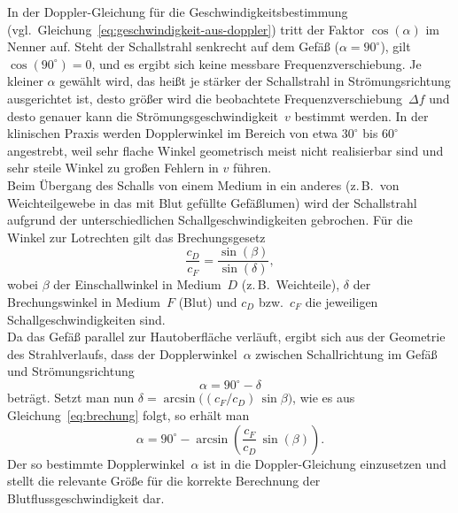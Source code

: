\documentclass[
	german,%
	accentcolor=3d,%
	type=intern, %
	marginpar=false,%
]{tudapub}
\begin{document}
      In der Doppler-Gleichung für die Geschwindigkeitsbestimmung (vgl.~Gleichung~\eqref{eq:geschwindigkeit-aus-doppler}) tritt der Faktor \(\cos(\alpha)\) im Nenner auf. Steht der Schallstrahl senkrecht auf dem Gefäß (\(\alpha = 90^\circ\)), gilt \(\cos(90^\circ) = 0\), und es ergibt sich keine messbare Frequenzverschiebung. Je kleiner \(\alpha\) gewählt wird, das heißt je stärker der Schallstrahl in Strömungsrichtung ausgerichtet ist, desto größer wird die beobachtete Frequenzverschiebung~\(\Delta f\) und desto genauer kann die Strömungsgeschwindigkeit~\(v\) bestimmt werden. In der klinischen Praxis werden Dopplerwinkel im Bereich von etwa \(30^\circ\) bis \(60^\circ\) angestrebt, weil sehr flache Winkel geometrisch meist nicht realisierbar sind und sehr steile Winkel zu großen Fehlern in \(v\) führen.
      \\
      Beim Übergang des Schalls von einem Medium in ein anderes (z.\,B.\ von Weichteilgewebe in das mit Blut gefüllte Gefäßlumen) wird der Schallstrahl aufgrund der unterschiedlichen Schallgeschwindigkeiten gebrochen. Für die Winkel zur Lotrechten gilt das Brechungsgesetz
      \begin{equation}
         \frac{c_D}{c_F} = \frac{\sin(\beta)}{\sin(\delta)},
         \label{eq:brechung}
      \end{equation}
      wobei \(\beta\) der Einschallwinkel in Medium~\(D\) (z.\,B.\ Weichteile), \(\delta\) der Brechungswinkel in Medium~\(F\) (Blut) und \(c_D\) bzw.\ \(c_F\) die jeweiligen Schallgeschwindigkeiten sind.
      \\
      Da das Gefäß parallel zur Hautoberfläche verläuft, ergibt sich aus der Geometrie des Strahlverlaufs, dass der Dopplerwinkel~\(\alpha\) zwischen Schallrichtung im Gefäß und Strömungsrichtung
      \begin{equation*}
         \alpha = 90^\circ - \delta
      \end{equation*}
      beträgt. Setzt man nun \(\delta = \arcsin\!\bigl((c_F/c_D)\,\sin\beta\bigr)\), wie es aus Gleichung~\eqref{eq:brechung} folgt, so erhält man
      \begin{equation}
         \alpha = 90^\circ - \arcsin\!\left(\frac{c_F}{c_D}\,\sin(\beta)\right).
         \label{eq:dopplerwinkel}
      \end{equation}
      Der so bestimmte Dopplerwinkel~\(\alpha\) ist in die Doppler-Gleichung einzusetzen und stellt die relevante Größe für die korrekte Berechnung der Blutflussgeschwindigkeit dar.
\end{document}

